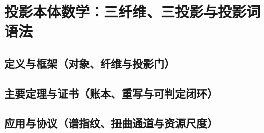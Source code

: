 \section{投影本体数学：三纤维、三投影与投影词语法}\label{sec:pom}

\subsection{定义与框架（对象、纤维与投影门）}




\subsection{主要定理与证书（账本、重写与可判定闭环）}






\subsection{应用与协议（谱指纹、扭曲通道与资源尺度）}









